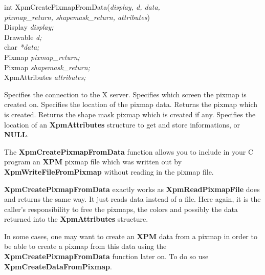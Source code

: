 \begin{flushleft} 

int XpmCreatePixmapFromData({\it display, d, data, \\
\hspace{3cm}pixmap\_return, shapemask\_return, attributes})\\

\hspace{1cm}Display {\it *display;}\\
\hspace{1cm}Drawable {\it d;}\\
\hspace{1cm}char {\it **data;}\\
\hspace{1cm}Pixmap {\it *pixmap\_return;}\\
\hspace{1cm}Pixmap {\it *shapemask\_return;}\\
\hspace{1cm}XpmAttributes {\it *attributes;}

\end{flushleft}

\begin{description}

 Specifies the connection to the X server.
 Specifies which screen the pixmap is created on.
 Specifies the location of the pixmap data.
 Returns the pixmap which is created.
 Returns the shape mask pixmap which is created if
any.
 Specifies the location of an {\bf XpmAttributes} structure
to get and store informations, or {\bf NULL}. 

\end{description} 

The {\bf XpmCreatePixmapFromData} function allows you to include in your C
program an {\bf XPM} pixmap file which was written out by {\bf
XpmWriteFileFromPixmap} without reading in the pixmap file.

{\bf XpmCreatePixmapFromData} exactly works as {\bf Xpm\-Read\-Pixmap\-File}
does and returns the same way. It just reads data instead of a file. Here
again, it is the caller's responsibility to free the pixmaps, the colors and
possibly the data returned into the {\bf XpmAttributes} structure.

\vspace{.5cm}
In some cases, one may want to create an {\bf XPM} data from a pixmap in order
to be able to create a pixmap from this data using the {\bf
XpmCreatePixmapFromData} function later on. To do so use {\bf
XpmCreateDataFromPixmap}.


